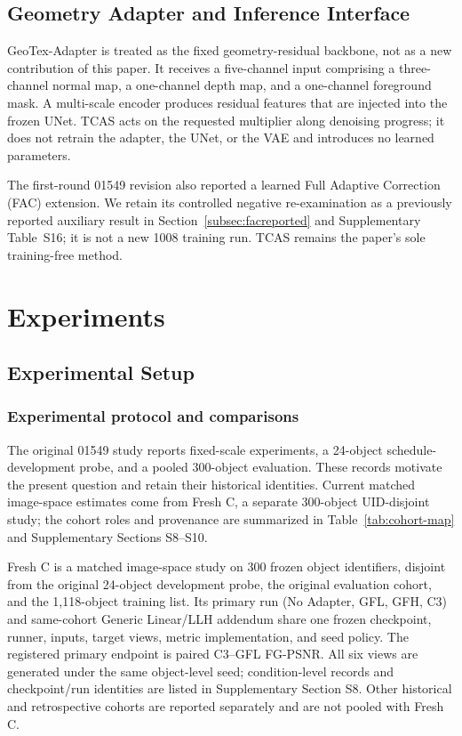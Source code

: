 \documentclass[times,twocolumn,final]{elsarticle}
\begin{document}
\subsection{Geometry Adapter and Inference Interface}
\label{subsec:adapterimpl}

GeoTex-Adapter is treated as the fixed geometry-residual backbone, not as a new contribution of this paper. It receives a five-channel input comprising a three-channel normal map, a one-channel depth map, and a one-channel foreground mask. A multi-scale encoder produces residual features that are injected into the frozen UNet. TCAS acts on the requested multiplier along denoising progress; it does not retrain the adapter, the UNet, or the VAE and introduces no learned parameters.

The first-round 01549 revision also reported a learned Full Adaptive Correction (FAC) extension. We retain its controlled negative re-examination as a previously reported auxiliary result in Section~\ref{subsec:facreported} and Supplementary Table~S16; it is not a new 1008 training run. TCAS remains the paper's sole training-free method.

\section{Experiments}
\label{sec:experiments}

\subsection{Experimental Setup}
\label{subsec:setup}

\subsubsection{Experimental protocol and comparisons}

The original 01549 study reports fixed-scale experiments, a 24-object schedule-development probe, and a pooled 300-object evaluation. These records motivate the present question and retain their historical identities. Current matched image-space estimates come from Fresh C, a separate 300-object UID-disjoint study; the cohort roles and provenance are summarized in Table~\ref{tab:cohort-map} and Supplementary Sections S8--S10.

Fresh C is a matched image-space study on 300 frozen object identifiers, disjoint from the original 24-object development probe, the original evaluation cohort, and the 1,118-object training list. Its primary run (No Adapter, GFL, GFH, C3) and same-cohort Generic Linear/LLH addendum share one frozen checkpoint, runner, inputs, target views, metric implementation, and seed policy. The registered primary endpoint is paired C3--GFL FG-PSNR. All six views are generated under the same object-level seed; condition-level records and checkpoint/run identities are listed in Supplementary Section S8. Other historical and retrospective cohorts are reported separately and are not pooled with Fresh C.
\end{document}
